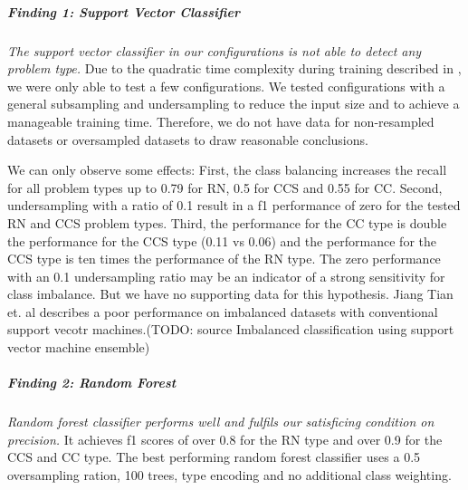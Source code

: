 \subparagraph{Finding 1: Support Vector Classifier} 
\textit{The support vector classifier in our configurations is not able to detect any problem type.}
Due to the quadratic time complexity during training described in , we were only able to test a few configurations. We tested configurations with a general subsampling and undersampling to reduce the input size and to achieve a manageable training time. Therefore, we do not have data for non-resampled datasets or oversampled datasets to draw reasonable conclusions.

We can only observe some effects:
First, the class balancing increases the recall for all problem types up to 0.79 for RN, 0.5 for CCS and 0.55 for CC. Second, undersampling with a ratio of 0.1 result in a f1 performance of zero for the tested RN and CCS problem types. Third, the performance for the CC type is double the performance for the CCS type (0.11 vs 0.06) and the performance for the CCS type is ten times the performance of the RN type. 
The zero performance with an 0.1 undersampling ratio may be an indicator of a strong sensitivity for class imbalance. But we have no supporting data for this hypothesis. Jiang Tian et. al describes a poor performance on imbalanced datasets with conventional support vecotr machines.(TODO: source Imbalanced classification using support vector machine ensemble)

\begin{center}
\end{center}


\subparagraph{Finding 2: Random Forest}
\textit{Random forest classifier performs well and fulfils our satisficing condition on precision.} It achieves f1 scores of over 0.8 for the RN type and over 0.9 for the CCS and CC type.
The best performing random forest classifier uses a 0.5 oversampling ration, 100 trees, type encoding and no additional class weighting.


